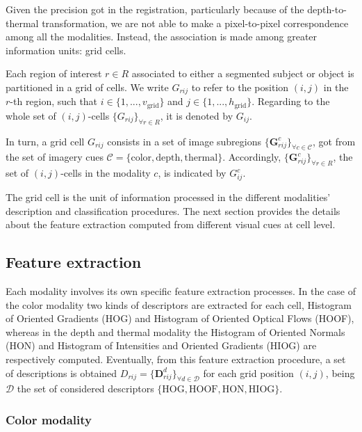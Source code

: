 \documentclass[10pt,twocolumn,letterpaper]{article}
\begin{document}
Given the precision got in the registration, particularly because of the depth-to-thermal transformation, we are not able to make a pixel-to-pixel correspondence among all the modalities. Instead, the association is made among greater information units: grid cells. 

Each region of interest $r \in R$ associated to either a segmented subject or object is partitioned in a grid of cells. We write $G_{rij}$ to refer to the position $(i,j)$ in the $r$-th region, such that $i \in \{ 1,...,v_\mathrm{grid} \}$ and $j \in \{ 1,...,h_\mathrm{grid} \}$. Regarding to the whole set of $(i,j)$-cells $\{G_{rij}\}_{\forall r \in R}$, it is denoted by $G_{ij}$.

In turn, a grid cell $G_{rij}$ consists in a set of image subregions $\{\mathbf{G}_{rij}^c\}_{\forall{c} \in \mathcal{C}}$, got from the set of imagery cues $\mathcal{C} = \{\mathrm{color}, \mathrm{depth}, \mathrm{thermal}\}$. Accordingly, $\{\mathbf{G}_{rij}^c\}_{\forall r \in R}$, the set of $(i,j)$-cells in the modality $c$, is indicated by $G_{ij}^c$.

The grid cell is the unit of information processed in the different modalities' description and classification procedures. The next section provides the details about the feature extraction computed from different visual cues at cell level.

\subsection{Feature extraction}
\label{ssec:feature extraction}

Each modality involves its own specific feature extraction processes. In the case of the color modality two kinds of descriptors are extracted for each cell, Histogram of Oriented Gradients (HOG) and Histogram of Oriented Optical Flows (HOOF), whereas in the depth and thermal modality the Histogram of Oriented Normals (HON) and Histogram of Intensities and Oriented Gradients (HIOG) are respectively computed. Eventually, from this feature extraction procedure, a set of descriptions is obtained $D_{rij} = \{\mathbf{D}_{rij}^d\}_{\forall d \in \mathcal{D}}$ for each grid position $(i,j)$, being $\mathcal{D}$ the set of considered descriptors $\{\mathrm{HOG}, \mathrm{HOOF}, \mathrm{HON}, \mathrm{HIOG}\}$.

\subsubsection{Color modality}
\label{sssec:color}
\end{document}
